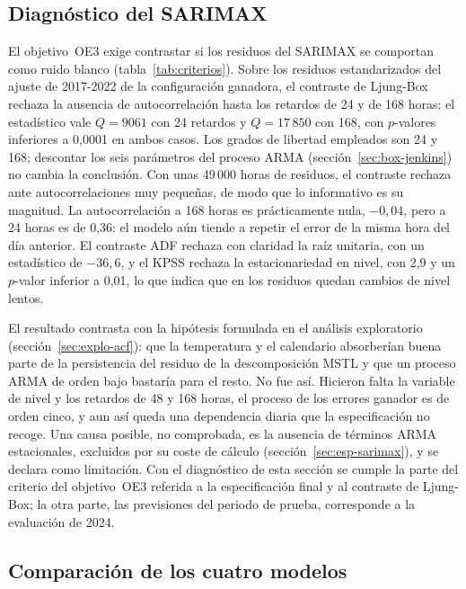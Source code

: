 \subsection{Diagnóstico del SARIMAX}\label{sec:val-sarimax}

El objetivo~OE3 exige contrastar si los residuos del SARIMAX se comportan
como ruido blanco (tabla~\ref{tab:criterios}). Sobre los residuos
estandarizados del ajuste de 2017-2022 de la configuración ganadora, el
contraste de Ljung-Box rechaza la ausencia de autocorrelación hasta los
retardos de 24 y de 168 horas: el estadístico vale $Q = 9061$ con 24
retardos y $Q = 17\,850$ con 168, con $p$-valores inferiores a 0,0001 en
ambos casos. Los grados de libertad empleados son 24 y 168; descontar los
seis parámetros del proceso ARMA (sección~\ref{sec:box-jenkins}) no cambia
la conclusión. Con unas 49\,000 horas de residuos, el contraste rechaza ante
autocorrelaciones muy pequeñas, de modo que lo informativo es su magnitud. La
autocorrelación a 168 horas es prácticamente nula, $-0{,}04$, pero a 24 horas
es de 0,36: el modelo aún tiende a repetir el error de la misma hora del día
anterior. El contraste ADF
rechaza con claridad la raíz unitaria, con un estadístico de $-36{,}6$, y el
KPSS rechaza la estacionariedad en nivel, con 2,9 y un $p$-valor inferior a
0,01, lo que indica que en los residuos quedan cambios de nivel lentos.

El resultado contrasta con la hipótesis formulada en el análisis
exploratorio (sección~\ref{sec:explo-acf}): que la temperatura y el
calendario absorberían buena parte de la persistencia del residuo de la
descomposición MSTL y que un proceso ARMA de orden bajo bastaría para el
resto. No fue así. Hicieron falta la variable de nivel y los retardos de 48 y
168 horas, el proceso de los errores ganador es de orden cinco, y aun así
queda una dependencia diaria que la especificación no recoge. Una causa
posible, no comprobada, es la ausencia de términos ARMA estacionales,
excluidos por su coste de cálculo (sección~\ref{sec:esp-sarimax}), y se
declara como limitación. Con el diagnóstico de esta sección se cumple la
parte del criterio del objetivo~OE3 referida a la especificación final y al
contraste de Ljung-Box; la otra parte, las previsiones del periodo de
prueba, corresponde a la evaluación de 2024.

\subsection{Comparación de los cuatro modelos}\label{sec:val-comparacion}

